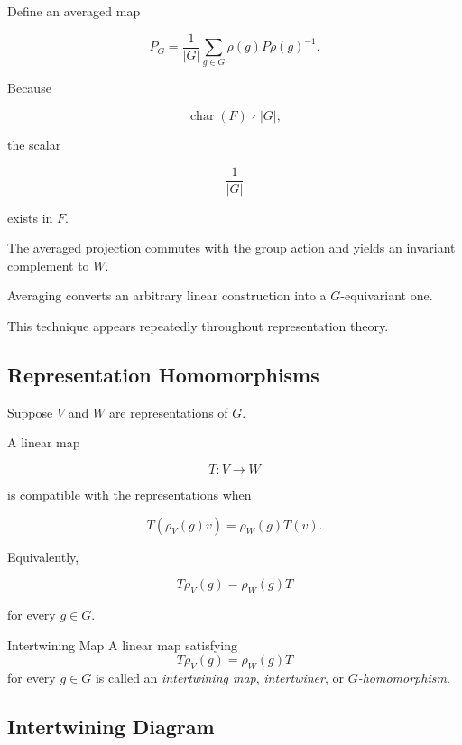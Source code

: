 Define an averaged map

\[ P_G=\frac{1}{|G|}\sum_{g\in G}\rho(g)P\rho(g)^{-1}. \]

Because

\[ \operatorname{char}(F)\nmid|G|, \]

the scalar

\[ \frac{1}{|G|} \]

exists in \(F\).

The averaged projection commutes with the group action and yields an
invariant complement to \(W\).

\begin{conceptbox}
Averaging converts an arbitrary linear construction into a
\(G\)-equivariant one.

This technique appears repeatedly throughout representation theory.
\end{conceptbox}

\subsection{Representation Homomorphisms}
\label{subsec:representation-homomorphisms}

Suppose \(V\) and \(W\) are representations of \(G\).

A linear map

\[ T:V\to W \]

is compatible with the representations when

\[ T(\rho_V(g)v)=\rho_W(g)T(v). \]

Equivalently,

\[ T\rho_V(g)=\rho_W(g)T \]

for every \(g\in G\).

\begin{definitionbox}{Intertwining Map}
A linear map satisfying
\[ T\rho_V(g)=\rho_W(g)T \]
for every \(g\in G\) is called an \emph{intertwining map},
\emph{intertwiner}, or \emph{\(G\)-homomorphism}.
\end{definitionbox}

\subsection{Intertwining Diagram}
\label{subsec:intertwining-diagram}

